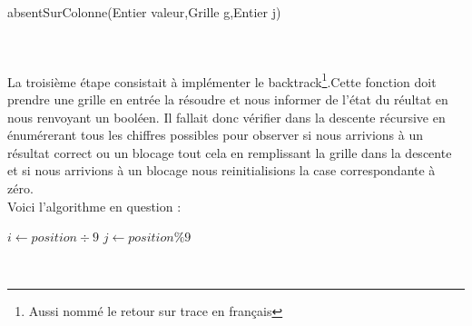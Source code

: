 \documentclass{article}
\begin{document}
\begin{algorithm}[H]
\SetAlgoLined
{}
\caption{absentSurColonne(Entier valeur,Grille g,Entier j)}
\end{algorithm}\\\\


La troisième étape consistait à implémenter le backtrack\footnote{Aussi nommé le retour sur trace en français}.Cette fonction doit prendre une grille en entrée la résoudre et nous informer de l'état du réultat en nous renvoyant un booléen.
Il fallait donc vérifier dans la descente récursive en énumérerant tous les chiffres possibles pour observer si nous arrivions à un résultat correct ou un blocage tout cela en remplissant la grille dans la descente et si nous arrivions à un blocage nous reinitialisions la case correspondante à zéro.\\
Voici l'algorithme en question :


\begin{algorithm}[H]
\SetAlgoLined
{}
$i \longleftarrow position \div 9  $
$j \longleftarrow position \% 9$\\
\end{algorithm}\\
\end{document}
